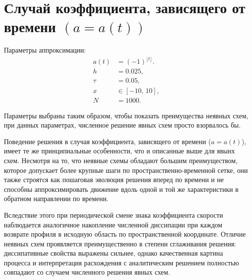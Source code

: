 \documentclass[a4paper,14pt]{extreport}
\begin{document}
\section*{{Случай коэффициента, зависящего от времени $(a=a(t))$}}

Параметры аппроксимации:
\[
\begin{aligned}
	a(t) &= (-1)^{\lfloor t \rfloor}. \\
	h &= 0.025, \\
	\tau &= 0.05, \\
	x &\in [-10,\,10], \\
	N &= 1000.
\end{aligned}
\]

Параметры выбраны таким образом, чтобы показать преимущества неявных схем, при данных параметрах, численное решение явных схем просто взорвалось бы.

Поведение решения в случая коэффициента, зависящего от времени ($a=a(t)$), имеет те же принципиальные особенности, что и описанные выше для явынх схем. Несмотря на то, что неявные схемы обладают большим преимуществом, которое допускает более крупные шаги по пространственно-временной сетке, они также строятся как пошаговая эволюция решения вперед по времени и не способны аппроксимировать движение вдоль одной и той же характеристики в обратном направлении по времени.

Вследствие этого при периодической смене знака коэффициента скорости наблюдается аналогичное накопление численной диссипации при каждом возврате профиля в исходную область по пространственной координате. Отличие неявных схем проявляется преимущественно в степени сглаживания решения: диссипативные свойства выражены сильнее, однако качественная картина процесса и интерпретация расхождения с аналитическим решением полностью совпадают со случаем численного решения явных схем.
\end{document}
